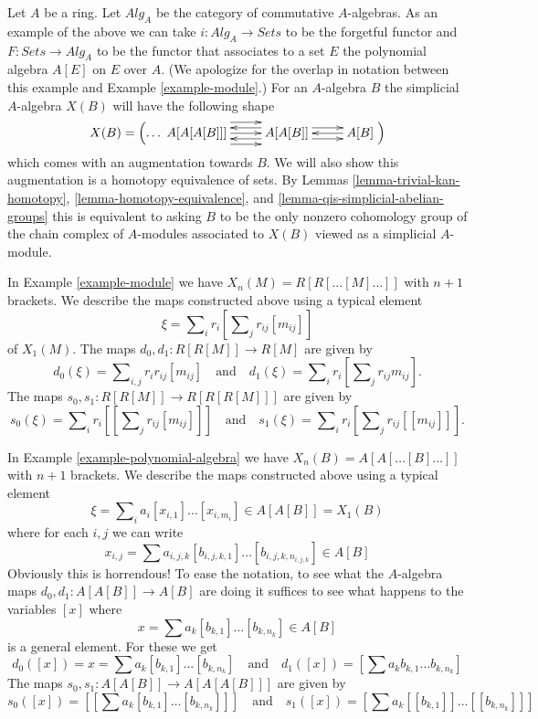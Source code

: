 \begin{example}
\label{example-polynomial-algebra}
Let $A$ be a ring. Let $\textit{Alg}_A$ be the category of commutative
$A$-algebras. As an example of the above we can take
$i : \textit{Alg}_A \to \textit{Sets}$ to be the forgetful functor
and $F : \textit{Sets} \to \textit{Alg}_A$ to be the functor that associates
to a set $E$ the polynomial algebra $A[E]$ on $E$ over $A$.
(We apologize for the overlap in notation between this example and
Example \ref{example-module}.) For an $A$-algebra $B$
the simplicial $A$-algebra $X(B)$ will have the following shape
$$
X(B) = \left( \ldots
\xymatrix{
A[A[A[B]]]
\ar@<2ex>[r]
\ar@<0ex>[r]
\ar@<-2ex>[r]
&
A[A[B]]
\ar@<1ex>[r]
\ar@<-1ex>[r]
\ar@<1ex>[l]
\ar@<-1ex>[l]
&
A[B]
\ar@<0ex>[l]
}
\right)
$$
which comes with an augmentation towards $B$. We will also show this
augmentation is a homotopy equivalence of sets. By Lemmas
\ref{lemma-trivial-kan-homotopy}, \ref{lemma-homotopy-equivalence}, and
\ref{lemma-qis-simplicial-abelian-groups}
this is equivalent to asking $B$ to be the only nonzero cohomology
group of the chain complex of $A$-modules
associated to $X(B)$ viewed as a simplicial $A$-module.
\end{example}

\begin{example}
\label{example-module-maps}
In Example \ref{example-module} we have $X_n(M) = R[R[\ldots [M]\ldots]]$
with $n + 1$ brackets. We describe the maps constructed above using a
typical element
$$
\xi = \sum\nolimits_i r_i\left[\sum\nolimits_j r_{ij}[m_{ij}]\right]
$$
of $X_1(M)$. The maps $d_0, d_1 : R[R[M]] \to R[M]$ are given by
$$
d_0(\xi) = \sum\nolimits_{i, j} r_ir_{ij}[m_{ij}]
\quad\text{and}\quad
d_1(\xi) = \sum\nolimits_i r_i\left[\sum\nolimits_j r_{ij}m_{ij}\right].
$$
The maps $s_0, s_1 : R[R[M]] \to R[R[R[M]]]$
are given by
$$
s_0(\xi) =
\sum\nolimits_i r_i\left[\left[\sum\nolimits_j r_{ij}[m_{ij}]\right]\right]
\quad\text{and}\quad
s_1(\xi) = \sum\nolimits_i r_i\left[\sum\nolimits_j r_{ij}[[m_{ij}]]\right].
$$
\end{example}

\begin{example}
\label{example-polynomial-algebra-maps}
In Example \ref{example-polynomial-algebra} we have
$X_n(B) = A[A[\ldots [B]\ldots]]$ with $n + 1$ brackets.
We describe the maps constructed above using a typical element
$$
\xi = \sum\nolimits_i a_i [x_{i, 1}] \ldots [x_{i, m_i}] \in A[A[B]] = X_1(B)
$$
where for each $i, j$ we can write
$$
x_{i, j} = \sum a_{i, j, k} [b_{i, j, k, 1}] \ldots [b_{i, j, k, n_{i, j, k}}]
\in A[B]
$$
Obviously this is horrendous! To ease the notation, to see what the
$A$-algebra maps $d_0, d_1 : A[A[B]] \to A[B]$ are doing it suffices
to see what happens to the variables $[x]$ where
$$
x = \sum a_k [b_{k, 1}] \ldots [b_{k, n_k}] \in A[B]
$$
is a general element. For these we get
$$
d_0([x]) = x = \sum a_k [b_{k, 1}] \ldots [b_{k, n_k}]
\quad\text{and}\quad
d_1([x]) = \left[\sum a_k b_{k, 1} \ldots b_{k, n_k}\right]
$$
The maps $s_0, s_1 : A[A[B]] \to A[A[A[B]]]$ are given by
$$
s_0([x]) = \left[\left[\sum a_k [b_{k, 1}] \ldots [b_{k, n_k}]\right]\right]
\quad\text{and}\quad
s_1([x]) = \left[\sum a_k [[b_{k, 1}]] \ldots [[b_{k, n_k}]]\right]
$$
\end{example}

